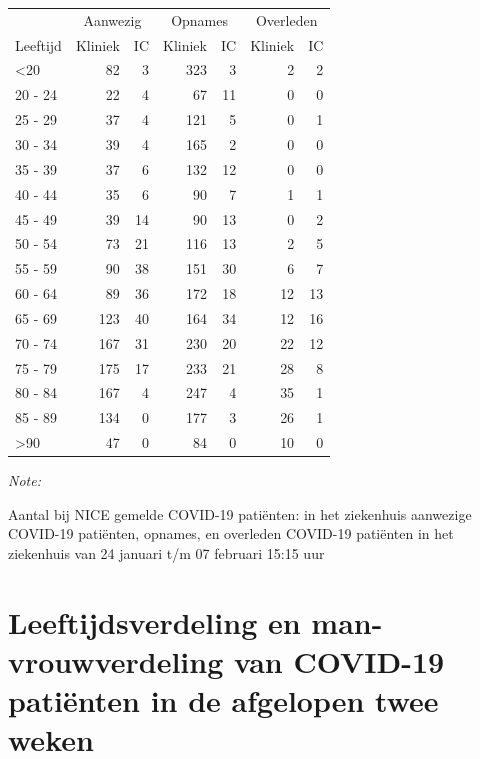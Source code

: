 \documentclass[
  english,
  man,floatsintext]{apa6}
\begin{document}
\begin{table}
\centering\begingroup\fontsize{10}{12}\selectfont

\begin{threeparttable}
\begin{tabular}{lrrrrrr}
\toprule
\multicolumn{1}{c}{ } & \multicolumn{2}{c}{Aanwezig} & \multicolumn{2}{c}{Opnames} & \multicolumn{2}{c}{Overleden} \\
\cmidrule(l{3pt}r{3pt}){2-3} \cmidrule(l{3pt}r{3pt}){4-5} \cmidrule(l{3pt}r{3pt}){6-7}
Leeftijd & Kliniek & IC & Kliniek & IC & Kliniek & IC\\
\midrule
<20 & 82 & 3 & 323 & 3 & 2 & 2\\
20 - 24 & 22 & 4 & 67 & 11 & 0 & 0\\
25 - 29 & 37 & 4 & 121 & 5 & 0 & 1\\
30 - 34 & 39 & 4 & 165 & 2 & 0 & 0\\
35 - 39 & 37 & 6 & 132 & 12 & 0 & 0\\
40 - 44 & 35 & 6 & 90 & 7 & 1 & 1\\
45 - 49 & 39 & 14 & 90 & 13 & 0 & 2\\
50 - 54 & 73 & 21 & 116 & 13 & 2 & 5\\
55 - 59 & 90 & 38 & 151 & 30 & 6 & 7\\
60 - 64 & 89 & 36 & 172 & 18 & 12 & 13\\
65 - 69 & 123 & 40 & 164 & 34 & 12 & 16\\
70 - 74 & 167 & 31 & 230 & 20 & 22 & 12\\
75 - 79 & 175 & 17 & 233 & 21 & 28 & 8\\
80 - 84 & 167 & 4 & 247 & 4 & 35 & 1\\
85 - 89 & 134 & 0 & 177 & 3 & 26 & 1\\
>90 & 47 & 0 & 84 & 0 & 10 & 0\\
\bottomrule
\end{tabular}
\begin{tablenotes}
\item \textit{Note: } 
\item Aantal bij NICE gemelde COVID-19 patiënten: in het ziekenhuis aanwezige COVID-19 patiënten, opnames, en overleden COVID-19 patiënten in het ziekenhuis van 24 januari t/m 07 februari 15:15 uur
\end{tablenotes}
\end{threeparttable}
\endgroup{}
\end{table}

\newpage

\hypertarget{leeftijdsverdeling-en-man-vrouwverdeling-van-covid-19-patiuxebnten-in-de-afgelopen-twee-weken}{%
\section{Leeftijdsverdeling en man-vrouwverdeling van COVID-19 patiënten in de afgelopen twee weken}\label{leeftijdsverdeling-en-man-vrouwverdeling-van-covid-19-patiuxebnten-in-de-afgelopen-twee-weken}}
\end{document}
